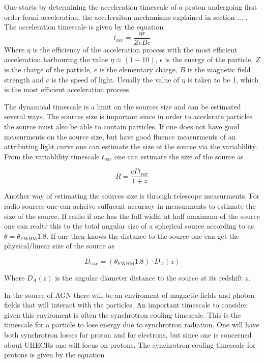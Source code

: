 One starts by determining the acceleration timescale of a proton undergoing first order fermi acceleration, the acceleraiton mechanisms explained in section ... . The acceleration timescale is given by the equation
\begin{equation}
    t_{acc} =  \frac{\eta \epsilon}{Z e B c}
\end{equation}
Where $\eta$ is the efficiency of the acceleration process with the most efficient acceleration harbouring the value $\eta \approx (1-10)$, $\epsilon$ is the energy of the particle, $Z$ is the charge of the particle, $e$ is the elementary charge, $B$ is the magnetic field strength and $c$ is the speed of light. 
Usually the value of $\eta$ is taken to be 1, which is the most efficient acceleration process.

The dynamical timescale is a limit on the sources size and can be estimated several ways. The sources size is important since in order to accelerate particles the source must also be able to contain particles. If one does not have good measurments on the source size, but have good fluence measurments of an attributing light curve one can estimate the size of the source via the variablility. From the variablility timescale $t_{var}$ one can estimate the size of the source as

\begin{equation}
    R = \frac{c \Gamma t_{var}}{1+z}
\end{equation}

Another way of estimating the sources size is through telescope measurments. For radio sources one can acheive suffucent accuracy in measurments to estimate the size of the source. If radio if one has the full widht at half maximum of the source one can realte this to the total angular size of a spherical source according to \cite{1983ApJ...264..296M} as $\theta = \theta_{\text{FWHM}} 1.8$. If one then knows the distance to the source one can get the physical/linear size of the source as 

\begin{equation}
    D_{\text{size}} = \left(\theta_{\text{FWHM}}1.8 \right) \cdot D_A(z)
\end{equation}

Where $D_A(z)$ is the angular diameter distance to the source at its redshift $z$.

In the source of AGN there will be an enviroment of magnetic fields and photon fields that will interact with the particles. An important timescale to consider given this enviroment is often the synchrotron cooling timescale. This is the timescale for a particle to lose energy due to synchrotron radiation. One will have both synchrotron losses for proton and for electrons, but since one is concerned about UHECRs one will focus on protons. The synchrotron cooling timescale for protons is given by the equation


